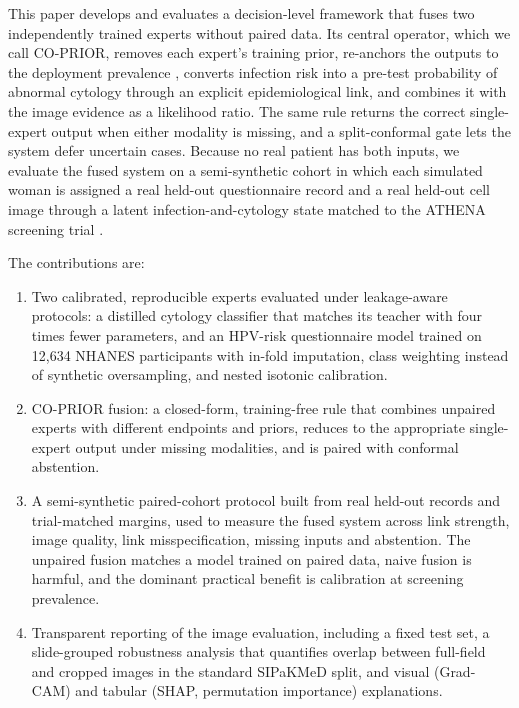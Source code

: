 \documentclass[lettersize,journal]{IEEEtran}
\begin{document}
This paper develops and evaluates a decision-level framework that fuses two independently trained experts without paired data. Its central operator, which we call CO-PRIOR, removes each expert's training prior, re-anchors the outputs to the deployment prevalence \cite{saerens2002adjusting}, converts infection risk into a pre-test probability of abnormal cytology through an explicit epidemiological link, and combines it with the image evidence as a likelihood ratio. The same rule returns the correct single-expert output when either modality is missing, and a split-conformal gate \cite{vovk2005algorithmic,angelopoulos2023conformal} lets the system defer uncertain cases. Because no real patient has both inputs, we evaluate the fused system on a semi-synthetic cohort in which each simulated woman is assigned a real held-out questionnaire record and a real held-out cell image through a latent infection-and-cytology state matched to the ATHENA screening trial \cite{wright2012athena}.

The contributions are:
\begin{enumerate}
\item Two calibrated, reproducible experts evaluated under leakage-aware protocols: a distilled cytology classifier that matches its teacher with four times fewer parameters, and an HPV-risk questionnaire model trained on 12,634 NHANES participants with in-fold imputation, class weighting instead of synthetic oversampling, and nested isotonic calibration.
\item CO-PRIOR fusion: a closed-form, training-free rule that combines unpaired experts with different endpoints and priors, reduces to the appropriate single-expert output under missing modalities, and is paired with conformal abstention.
\item A semi-synthetic paired-cohort protocol built from real held-out records and trial-matched margins, used to measure the fused system across link strength, image quality, link misspecification, missing inputs and abstention. The unpaired fusion matches a model trained on paired data, naive fusion is harmful, and the dominant practical benefit is calibration at screening prevalence.
\item Transparent reporting of the image evaluation, including a fixed test set, a slide-grouped robustness analysis that quantifies overlap between full-field and cropped images in the standard SIPaKMeD split, and visual (Grad-CAM) and tabular (SHAP, permutation importance) explanations.
\end{enumerate}
\end{document}
